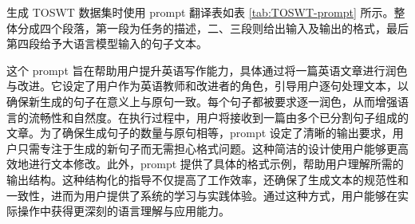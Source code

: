 生成 TOSWT 数据集时使用 prompt 翻译表如表 \ref{tab:TOSWT-prompt} 所示。整体分成四个段落，第一段为任务的描述，二、三段则给出输入及输出的格式，最后第四段给予大语言模型输入的句子文本。

这个 prompt 旨在帮助用户提升英语写作能力，具体通过将一篇英语文章进行润色与改进。它设定了用户作为英语教师和改进者的角色，引导用户逐句处理文本，以确保新生成的句子在意义上与原句一致。每个句子都被要求逐一润色，从而增强语言的流畅性和自然度。在执行过程中，用户将接收到一篇由多个已分割句子组成的文章。为了确保生成句子的数量与原句相等，prompt 设定了清晰的输出要求，用户只需专注于生成的新句子而无需担心格式问题。这种简洁的设计使用户能够更高效地进行文本修改。此外，prompt 提供了具体的格式示例，帮助用户理解所需的输出结构。这种结构化的指导不仅提高了工作效率，还确保了生成文本的规范性和一致性，进而为用户提供了系统的学习与实践体验。通过这种方式，用户能够在实际操作中获得更深刻的语言理解与应用能力。


